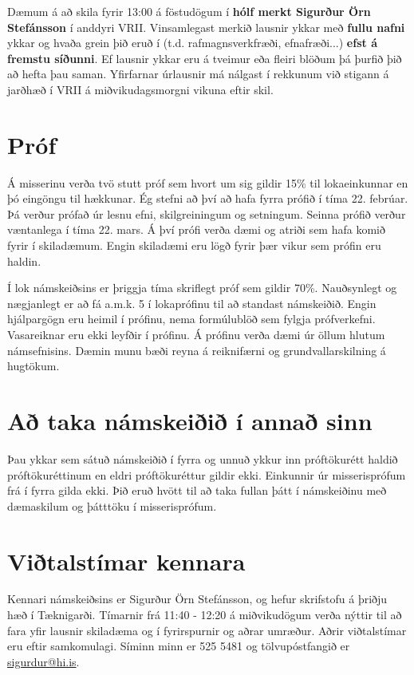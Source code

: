 \documentclass[a4paper,10pt,icelandic]{sphinxmanual}
\begin{document}
Dæmum á að skila fyrir 13:00 á föstudögum í \textbf{hólf merkt Sigurður Örn Stefánsson} í anddyri VRII.  Vinsamlegast merkið lausnir ykkar með \textbf{fullu nafni} ykkar og hvaða grein þið eruð í (t.d. rafmagnsverkfræði, efnafræði...)  \textbf{efst á fremstu síðunni}.  Ef lausnir ykkar eru á tveimur eða fleiri blöðum þá þurfið þið að hefta þau saman. Yfirfarnar úrlausnir má nálgast í rekkunum við stigann á jarðhæð í VRII á miðvikudagsmorgni vikuna eftir skil.


\section*{Próf}
\label{umnamskeidid:prof}
Á misserinu verða tvö stutt próf sem hvort um sig gildir 15\% til lokaeinkunnar en þó eingöngu til hækkunar.   Ég stefni að því að hafa fyrra prófið í tíma 22. febrúar.  Þá verður prófað úr lesnu efni, skilgreiningum og setningum.  Seinna prófið verður væntanlega í tíma 22. mars.  Á því prófi verða dæmi og atriði sem hafa komið fyrir í skiladæmum.  Engin skiladæmi eru lögð fyrir þær vikur sem prófin eru haldin.

Í lok námskeiðsins er þriggja tíma skriflegt próf sem gildir 70\%.  Nauðsynlegt og nægjanlegt er að fá a.m.k. 5 í lokaprófinu til að standast námskeiðið. Engin hjálpargögn eru heimil í prófinu, nema formúlublöð sem fylgja prófverkefni. Vasareiknar eru ekki leyfðir í prófinu. Á prófinu verða dæmi úr öllum hlutum námsefnisins.  Dæmin munu bæði reyna á reiknifærni og grundvallarskilning á hugtökum.


\section*{Að taka námskeiðið í annað sinn}
\label{umnamskeidid:a-taka-namskeii-i-anna-sinn}
Þau ykkar sem sátuð námskeiðið í fyrra og unnuð ykkur inn próftökurétt haldið próftökuréttinum en eldri próftökuréttur gildir ekki. Einkunnir úr misserisprófum frá í fyrra gilda ekki. Þið eruð hvött til að taka fullan þátt í námskeiðinu með dæmaskilum og þátttöku í misserisprófum.


\section*{Viðtalstímar kennara}
\label{umnamskeidid:vitalstimar-kennara}
Kennari námskeiðsins er Sigurður Örn Stefánsson, og hefur skrifstofu á þriðju hæð í Tæknigarði.  Tímarnir frá 11:40 - 12:20 á miðvikudögum verða nýttir til að fara yfir lausnir skiladæma og í fyrirspurnir og aðrar umræður. Aðrir viðtalstímar eru eftir samkomulagi.  Síminn minn er 525 5481 og tölvupóstfangið er \href{mailto:sigurdur@hi.is}{sigurdur@hi.is}.
\end{document}
